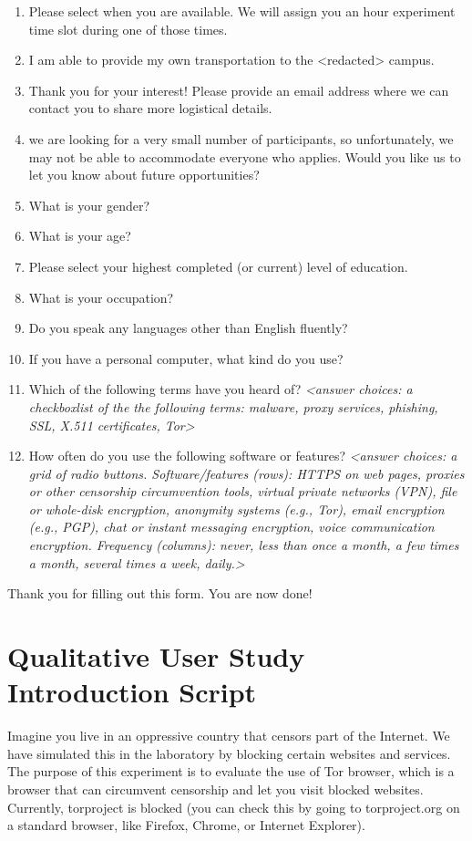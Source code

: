 \documentclass[USenglish,oneside,twocolumn]{article}
\begin{document}
\begin{enumerate}
\item{Please select when you are available. We will assign you an hour experiment time slot during one of those times.}
\item{I am able to provide my own transportation to the <redacted> %
campus.}
\item{Thank you for your interest! Please provide an email address where we can contact you to share more logistical details.}
\item{we are looking for a very small number of participants, so unfortunately, we may not be able to accommodate everyone who applies. Would you like us to let you know about future opportunities?}
\item{What is your gender?}
\item{What is your age?}
\item{Please select your highest completed (or current) level of education.}
\item{What is your occupation?} 
\item{Do you speak any languages other than English fluently?}
\item{If you have a personal computer, what kind do you use?}
\item{Which of the following terms have you heard of? \textit{<answer choices: a checkboxlist of the the following terms: malware, proxy services, phishing, SSL, X.511 certificates, Tor>}}
\item{How often do you use the following software or features? \textit{<answer choices: a grid of radio buttons. Software/features (rows): HTTPS on web pages, proxies or other censorship circumvention tools, virtual private networks (VPN), file or whole-disk encryption, anonymity systems (e.g., Tor), email encryption (e.g., PGP), chat or instant messaging encryption, voice communication encryption. Frequency (columns): never, less than once a month, a few times a month, several times a week, daily.>}}
\end{enumerate}
Thank you for filling out this form. You are now done!

\section{Qualitative User Study Introduction Script} 
\label{qualitative-script} 
Imagine you live in an oppressive country that censors part of the Internet. We have simulated this in the laboratory by blocking certain websites and services.  The purpose of this experiment is to evaluate the use of Tor browser, which is a browser that can circumvent censorship and let you visit blocked websites. Currently, torproject is blocked (you can check this by going to torproject.org on a standard browser, like Firefox, Chrome, or Internet Explorer). 
\end{document}
